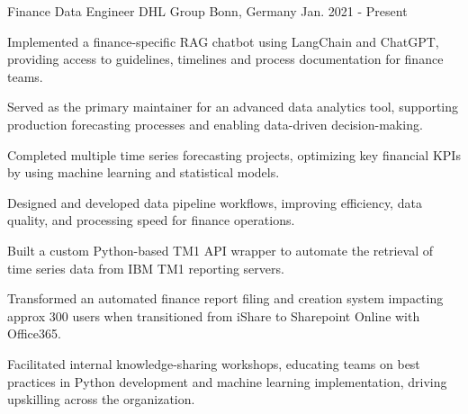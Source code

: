 

\begin{cventries}
\cventry
  {Finance Data Engineer} %
  {DHL Group} %
  {Bonn, Germany} %
  {Jan. 2021 - Present} %
  {
    \begin{cvitems} %
      \item {Implemented a finance-specific RAG chatbot using LangChain and ChatGPT, providing access to guidelines, timelines and process documentation for finance teams.}
      \item {Served as the primary maintainer for an advanced data analytics tool, supporting production forecasting processes and enabling data-driven decision-making.}
      \item {Completed multiple time series forecasting projects, optimizing key financial KPIs by using machine learning and statistical models.}
      \item {Designed and developed data pipeline workflows, improving efficiency, data quality, and processing speed for finance operations.} 
      \item {Built a custom Python-based TM1 API wrapper to automate the retrieval of time series data from IBM TM1 reporting servers.} 
      \item {Transformed an automated finance report filing and creation system impacting approx 300 users when transitioned from iShare to Sharepoint Online with Office365.}
      \item {Facilitated internal knowledge-sharing workshops, educating teams on best practices in Python development and machine learning implementation, driving upskilling across the organization.} 
    \end{cvitems} 
  }


\end{cventries}
